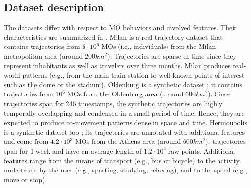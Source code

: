 \documentclass[
]{ceurart}
\renewcommand{\sf}[1]{\textsf{\textup{#1}}}
\begin{document}
\subsection{Dataset description}
The datasets differ with respect to MO behaviors and involved features.
Their characteristics are summarized in .
\sf{Milan} is a real trajectory dataset that contains trajectories from $6 \cdot 10^6$ MOs (i.e., individuals) from the Milan metropolitan area (around $200 km^2$).
Trajectories are sparse in time since they represent inhabitants as well as travelers over three months.
\sf{Milan} produces real-world patterns (e.g., from the main train station to well-known points of interest such as the dome or the stadium).
\sf{Oldenburg} is a synthetic dataset \citep{DBLP:journals/geoinformatica/Brinkhoff02};
it contains trajectories from $10^6$ MOs from the Oldenburg area (around $600 km^2$).
Since trajectories span for 246 timestamps, %
the synthetic trajectories are highly temporally overlapping and condensed in a small period of time.
Hence, they are expected to produce co-movement patterns dense in space and time. %
\sf{Hermoupolis} is a synthetic dataset too \citep{DBLP:journals/sigspatial/PelekisSTT15}; its trajectories are annotated with additional features and come from $4.2 \cdot 10^3$ MOs from the Athens area (around $600 km^2$); trajectories span for 1 week and have an average length of $1.2 \cdot 10^4$ raw points.
Additional features range from the means of transport (e.g., bus or bicycle) to the activity undertaken by the user (e.g., sporting, studying, relaxing), and to the speed (e.g., move or stop).
\end{document}
